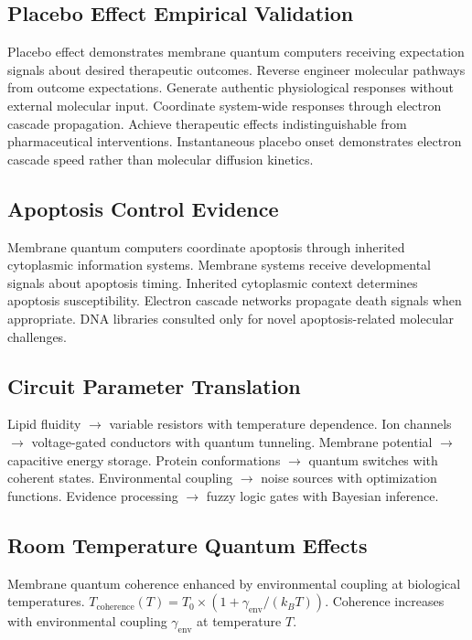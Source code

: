 \documentclass[12pt,a4paper]{article}
\begin{document}
\subsection{Placebo Effect Empirical Validation}

Placebo effect demonstrates membrane quantum computers receiving expectation signals about desired therapeutic outcomes. Reverse engineer molecular pathways from outcome expectations. Generate authentic physiological responses without external molecular input. Coordinate system-wide responses through electron cascade propagation. Achieve therapeutic effects indistinguishable from pharmaceutical interventions. Instantaneous placebo onset demonstrates electron cascade speed rather than molecular diffusion kinetics.

\subsection{Apoptosis Control Evidence}

Membrane quantum computers coordinate apoptosis through inherited cytoplasmic information systems. Membrane systems receive developmental signals about apoptosis timing. Inherited cytoplasmic context determines apoptosis susceptibility. Electron cascade networks propagate death signals when appropriate. DNA libraries consulted only for novel apoptosis-related molecular challenges.

\subsection{Circuit Parameter Translation}

Lipid fluidity $\to$ variable resistors with temperature dependence. Ion channels $\to$ voltage-gated conductors with quantum tunneling. Membrane potential $\to$ capacitive energy storage. Protein conformations $\to$ quantum switches with coherent states. Environmental coupling $\to$ noise sources with optimization functions. Evidence processing $\to$ fuzzy logic gates with Bayesian inference.

\subsection{Room Temperature Quantum Effects}

Membrane quantum coherence enhanced by environmental coupling at biological temperatures. $T_{\text{coherence}}(T) = T_0 \times (1 + \gamma_{\text{env}}/(k_BT))$. Coherence increases with environmental coupling $\gamma_{\text{env}}$ at temperature $T$.
\end{document}
